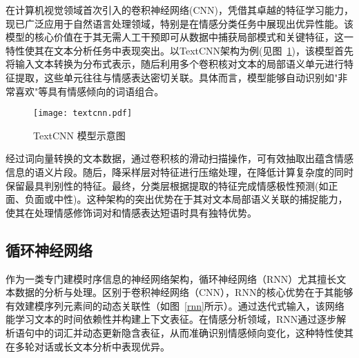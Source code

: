 在计算机视觉领域首次引入的卷积神经网络(CNN)，凭借其卓越的特征学习能力，现已广泛应用于自然语言处理领域，特别是在情感分类任务中展现出优异性能。该模型的核心价值在于其无需人工干预即可从数据中捕获局部模式和关键特征，这一特性使其在文本分析任务中表现突出。以TextCNN架构为例(见图~\ref{textcnn})，该模型首先将输入文本转换为分布式表示，随后利用多个卷积核对文本的局部语义单元进行特征提取，这些单元往往与情感表达密切关联。具体而言，模型能够自动识别如"非常喜欢"等具有情感倾向的词语组合。

\begin{figure}[ht]
  \centering
  \texttt{[image: textcnn.pdf]}
  \caption{TextCNN 模型示意图}
  \label{textcnn}
\end{figure}


经过词向量转换的文本数据，通过卷积核的滑动扫描操作，可有效抽取出蕴含情感信息的语义片段。随后，降采样层对特征进行压缩处理，在降低计算复杂度的同时保留最具判别性的特征。最终，分类层根据提取的特征完成情感极性预测(如正面、负面或中性)。这种架构的突出优势在于其对文本局部语义关联的捕捉能力，使其在处理情感修饰词对和情感表达短语时具有独特优势。

\subsection{循环神经网络}


作为一类专门建模时序信息的神经网络架构，循环神经网络（RNN）尤其擅长文本数据的分析与处理。区别于卷积神经网络（CNN），RNN的核心优势在于其能够有效建模序列元素间的动态关联性（如图~\ref{rnn}所示）。通过迭代式输入，该网络能学习文本的时间依赖性并构建上下文表征。在情感分析领域，RNN通过逐步解析语句中的词汇并动态更新隐含表征，从而准确识别情感倾向变化，这种特性使其在多轮对话或长文本分析中表现优异。

